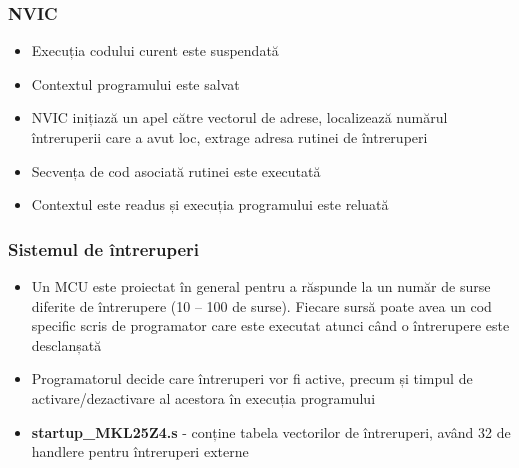 \documentclass[xcolor={table}]{beamer}
\begin{document}
				\begin{frame}
			\frametitle{NVIC}
			\begin{itemize}
		       \item Execuția codului curent este suspendată
		       \item Contextul programului este salvat
		       \item NVIC inițiază un apel către vectorul de adrese, localizează numărul întreruperii care a avut loc, extrage adresa rutinei de întreruperi
		       \item Secvența de cod asociată rutinei este executată
		       \item Contextul este readus și execuția programului este reluată
			\end{itemize}
		\end{frame}
		\begin{frame}
		    \frametitle{Sistemul de întreruperi}
		    \begin{itemize}
		        \item Un MCU este proiectat în general pentru a răspunde la un număr de surse diferite de întrerupere (10 – 100 de surse). Fiecare sursă poate avea un cod specific scris de programator care este executat atunci când o întrerupere este desclanșată 
		        \item Programatorul decide care întreruperi vor fi active, precum și timpul de activare/dezactivare al acestora în execuția programului
		        \item \textbf{startup\_MKL25Z4.s} - conține tabela vectorilor de întreruperi, având 32 de handlere pentru întreruperi externe
		    \end{itemize}
		    
		\end{frame}
		
\end{document}
